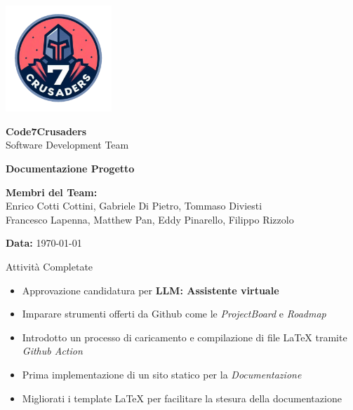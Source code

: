 \documentclass{beamer}
\begin{document}
\begin{frame}[plain] %
    \centering
    \vspace*{2cm}
    
    \includegraphics[width=0.3\textwidth]{../img/logo/7Crusaders_logo.png} %
    \vspace{1cm}
    
    {\Huge \textbf{Code7Crusaders}}\\
    \vspace{0.5cm}
    {\Large Software Development Team}\\
    \vspace{2cm}
    
    {\large \textbf{Documentazione Progetto}}\\
    \vspace{3cm}

    \textbf{Membri del Team:}\\
    Enrico Cotti Cottini, Gabriele Di Pietro, Tommaso Diviesti \\
    Francesco Lapenna, Matthew Pan, Eddy Pinarello, Filippo Rizzolo \\
    \vspace{1cm}
    
    {\large \textbf{Data:}} \today\\
    
    \vspace{1cm}
\end{frame}

\begin{frame}
    \begin{exampleblock}{Attività Completate}
        \begin{itemize}
            \item Approvazione candidatura per \textbf{LLM: Assistente virtuale}
            \item Imparare strumenti offerti da Github come le \emph{ProjectBoard} e \emph{Roadmap}
            \item Introdotto un processo di caricamento e compilazione di file LaTeX tramite \emph{Github Action}
            \item Prima implementazione di un sito statico per la \emph{Documentazione}
            \item Migliorati i template LaTeX per facilitare la stesura della documentazione
        \end{itemize}
    \end{exampleblock}
\end{frame}
\end{document}

